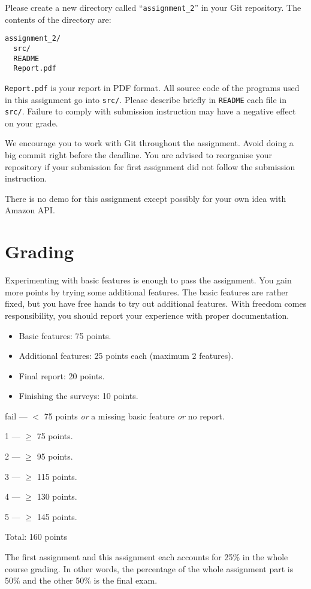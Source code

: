 \documentclass[12pt, a4paper]{article}
\begin{document}
Please create a new directory called ``\texttt{assignment\_2}'' in your Git repository.
The contents of the directory are:
\begin{verbatim}
assignment_2/
  src/
  README
  Report.pdf
\end{verbatim}

\texttt{Report.pdf} is your report in PDF format.
All source code of the programs used in this assignment go into \texttt{src/}.
Please describe briefly in \texttt{README} each file in \texttt{src/}.
Failure to comply with submission instruction may have a negative effect on your grade.

We encourage you to work with Git throughout the assignment.
Avoid doing a big commit right before the deadline.
You are advised to reorganise your repository if your submission for first assignment did not follow the submission instruction.

There is no demo for this assignment except possibly for your own idea with Amazon API.

\section{Grading}
Experimenting with basic features is enough to pass the assignment.
You gain more points by trying some additional features.
The basic features are rather fixed, but you have free hands to try out additional features.
With freedom comes responsibility, you should report your experience with proper documentation.

\vskip 20pt

\begin{itemize}
\item Basic features: 75 points.
\item Additional features: 25 points each (maximum 2 features).
\item Final report: 20 points.
\item Finishing the surveys: 10 points.
\end{itemize}

\vskip 10pt

fail --- $<$ 75 points \emph{or} a missing basic feature \emph{or} no report.

1 --- $\ge$ 75 points.

2 --- $\ge$ 95 points.

3 --- $\ge$ 115 points.

4 --- $\ge$ 130 points.

5 --- $\ge$ 145 points.

\vskip 20pt

Total: 160 points

\vskip 20pt

The first assignment and this assignment each accounts for 25\% in the whole course grading.
In other words, the percentage of the whole assignment part is 50\% and the other 50\% is the final exam.
\end{document}
